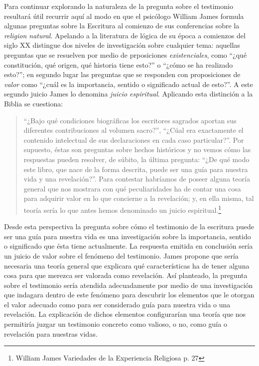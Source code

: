 Para continuar explorando la naturaleza de la pregunta sobre el testimonio
resultará útil recurrir aquí al modo en que el psicólogo William James formula
algunas preguntas sobre la Escritura al comienzo de sus conferencias sobre la
\emph{religion natural}. Apelando a la literatura de lógica de su época a
comienzos del siglo XX distingue dos niveles de investigación sobre cualquier
tema: aquellas preguntas que se resuelven por medio de prposiciones
\emph{existenciales}, como ``¿qué constitución, qué origen, qué historia tiene
esto?'' o ``¿cómo se ha realizado esto?''; en segundo lugar las preguntas que se
responden con proposiciones de \emph{valor} como ``¿cuál es la importancia,
sentido o significado actual de esto?''. A este segundo juicio James lo denomina
\emph{juicio espiritual}. Aplicando esta distinción a la Biblia se cuestiona:

\blockquote[{\cite{james}}]{\enquote{¿Bajo qué condiciones biográficas los escritores sagrados
    aportan sus diferentes contribuciones al volumen sacro?}, \enquote{¿Cúal era
    exactamente el contenido intelectual de sus declaraciones en cada caso
    particular?}. Por supuesto, éstas son preguntas sobre hechos históricos y no
  vemos cómo las respuestas pueden resolver, de súbito, la última pregunta:
  \enquote{¿De qué modo este libro, que nace de la forma descrita, puede ser una
    guía para nuestra vida y una revelación?}. Para contestar habríamos de
  poseer alguna teoría general que nos mostrara con qué peculiaridades ha de
  contar una cosa para adquirir valor en lo que concierne a la revelación; y, en
  ella misma, tal teoría sería lo que antes hemos denominado un juicio
  espiritual.\footnote{William James Variedades de la Experiencia Religiosa p.
    27} }

      Desde esta perspectiva la pregunta sobre cómo el testimonio de la escritura
      puede ser una guía para nuestra vida es una investigación sobre la importancia,
      sentido o significado que ésta tiene actualmente. La respuesta emitida en
      conclusión sería un juicio de valor sobre el fenómeno del testimonio. James
      propone que sería necesaria una teoría general que explicara qué características
      ha de tener alguna cosa para que merezca ser valorada como revelación. Así
      planteado, la pregunta sobre el testimonio sería atendida adecuadamente por
      medio de una investigación que indagara dentro de este fenómeno para descubrir
      los elementos que le otorgan el valor adecuado como para ser considerado guía
      para nuestra vida o una revelación. La explicación de dichos elementos
      configurarían una teoría que nos permitiría juzgar un testimonio concreto como
      valioso, o no, como guía o revelación para nuestras vidas.


